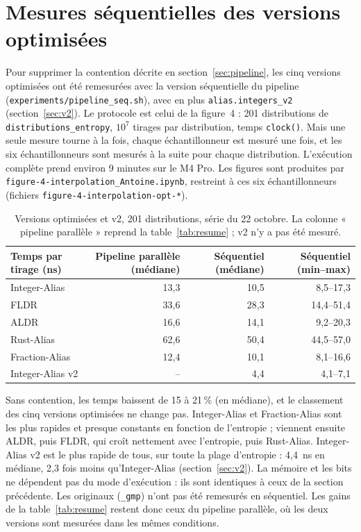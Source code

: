 \documentclass[11pt,a4paper]{article}
\newcommand{\code}[1]{\texttt{#1}}
\begin{document}
\section{Mesures séquentielles des versions optimisées}
\label{sec:sequentiel}

Pour supprimer la contention décrite en section~\ref{sec:pipeline}, les cinq versions
optimisées ont été remesurées avec la version séquentielle du pipeline
(\code{experiments/pipeline\_seq.sh}), avec en plus \code{alias.integers\_v2}
(section~\ref{sec:v2}). Le protocole est celui de la figure~4 :
201 distributions de \code{distributions\_entropy}, $10^7$ tirages par distribution,
temps \code{clock()}. Mais une seule mesure tourne à la fois, chaque échantillonneur est
mesuré une fois, et les six échantillonneurs sont mesurés à la suite pour chaque
distribution. L'exécution complète prend environ 9 minutes sur le M4 Pro. Les figures
sont produites par \code{figure-4-interpolation\_Antoine.ipynb}, restreint à ces six
échantillonneurs (fichiers \code{figure-4-interpolation-opt-*}).

\begin{table}[H]
\centering
\small
\begin{tabular}{lrrr}
\toprule
Temps par tirage (ns) & Pipeline parallèle (médiane) & Séquentiel (médiane) & Séquentiel (min--max) \\
\midrule
Integer-Alias  & 13,3 & 10,5 & 8,5--17,3 \\
FLDR           & 33,6 & 28,3 & 14,4--51,4 \\
ALDR           & 16,6 & 14,1 & 9,2--20,3 \\
Rust-Alias     & 62,6 & 50,4 & 44,5--57,0 \\
Fraction-Alias & 12,4 & 10,1 & 8,1--16,6 \\
\midrule
Integer-Alias v2 & -- & 4,4 & 4,1--7,1 \\
\bottomrule
\end{tabular}
\caption{Versions optimisées et v2, 201 distributions, série du 22 octobre. La colonne
« pipeline parallèle » reprend la table~\ref{tab:resume} ; v2 n'y a pas été mesuré.}
\end{table}

\noindent Sans contention, les temps baissent de 15 à 21\,\% (en médiane), et le
classement des cinq versions optimisées ne change pas. Integer-Alias et Fraction-Alias
sont les plus rapides et presque constants en fonction de l'entropie ; viennent ensuite
ALDR, puis FLDR, qui croît nettement avec l'entropie, puis Rust-Alias. Integer-Alias v2
est le plus rapide de tous, sur toute la plage d'entropie : 4,4~ns en médiane, 2,3 fois
moins qu'Integer-Alias (section~\ref{sec:v2}). La mémoire et les bits ne dépendent
pas du mode d'exécution : ils sont identiques à ceux de la section précédente. Les
originaux (\code{\_gmp}) n'ont pas été remesurés en séquentiel. Les gains de la
table~\ref{tab:resume} restent donc ceux du pipeline parallèle, où les deux versions
sont mesurées dans les mêmes conditions.
\end{document}
